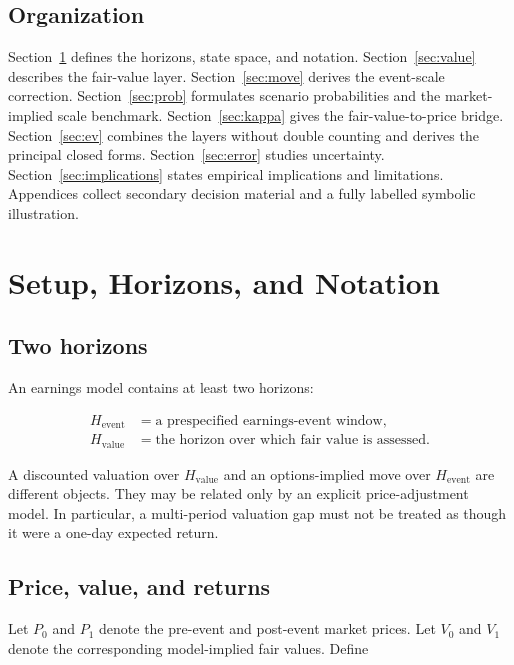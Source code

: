 \subsection{Organization}

Section~\ref{sec:setup} defines the horizons, state space, and notation.
Section~\ref{sec:value} describes the fair-value layer. Section~\ref{sec:move}
derives the event-scale correction. Section~\ref{sec:prob} formulates scenario
probabilities and the market-implied scale benchmark. Section~\ref{sec:kappa} gives the
fair-value-to-price bridge. Section~\ref{sec:ev} combines the layers without
double counting and derives the principal closed forms. Section~\ref{sec:error}
studies uncertainty. Section~\ref{sec:implications} states empirical
implications and limitations. Appendices collect secondary decision material
and a fully labelled symbolic illustration.

\section{Setup, Horizons, and Notation}
\label{sec:setup}

\subsection{Two horizons}

An earnings model contains at least two horizons:

\[
\boxed{
\begin{aligned}
  H_{\mathrm{event}} &= \text{a prespecified earnings-event window},\\
  H_{\mathrm{value}} &= \text{the horizon over which fair value is assessed}.
\end{aligned}}
\]

A discounted valuation over $H_{\mathrm{value}}$ and an options-implied move
over $H_{\mathrm{event}}$ are different objects. They may be related only by an
explicit price-adjustment model. In particular, a multi-period valuation gap must
not be treated as though it were a one-day expected return.

\subsection{Price, value, and returns}

Let $P_0$ and $P_1$ denote the pre-event and post-event market prices. Let
$V_0$ and $V_1$ denote the corresponding model-implied fair values. Define

